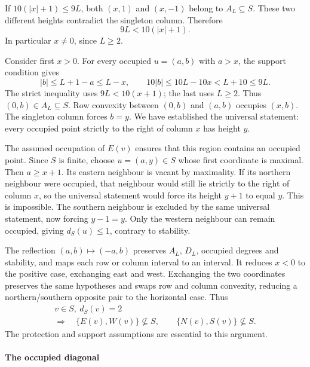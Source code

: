\documentclass[
  11pt,
  a4paper,
]{article}
\begin{document}
If \(10(|x|+1)\le9L\), both \((x,1)\) and \((x,-1)\) belong to
\(A_L\subseteq S\). These two different heights contradict the singleton
column. Therefore \[
9L<10(|x|+1).
\] In particular \(x\ne0\), since \(L\ge2\).

Consider first \(x>0\). For every occupied \(u=(a,b)\) with \(a>x\), the
support condition gives \[
|b|\le L+1-a\le L-x,\qquad
10|b|\le10L-10x<L+10\le9L.
\] The strict inequality uses \(9L<10(x+1)\); the last uses \(L\ge2\).
Thus \((0,b)\in A_L\subseteq S\). Row convexity between \((0,b)\) and
\((a,b)\) occupies \((x,b)\). The singleton column forces \(b=y\). We
have established the universal statement: every occupied point strictly
to the right of column \(x\) has height \(y\).

The assumed occupation of \(E(v)\) ensures that this region contains an
occupied point. Since \(S\) is finite, choose \(u=(a,y)\in S\) whose
first coordinate is maximal. Then \(a\ge x+1\). Its eastern neighbour is
vacant by maximality. If its northern neighbour were occupied, that
neighbour would still lie strictly to the right of column \(x\), so the
universal statement would force its height \(y+1\) to equal \(y\). This
is impossible. The southern neighbour is excluded by the same universal
statement, now forcing \(y-1=y\). Only the western neighbour can remain
occupied, giving \(d_S(u)\le1\), contrary to stability.

The reflection \((a,b)\mapsto(-a,b)\) preserves \(A_L\), \(D_L\),
occupied degrees and stability, and maps each row or column interval to
an interval. It reduces \(x<0\) to the positive case, exchanging east
and west. Exchanging the two coordinates preserves the same hypotheses
and swaps row and column convexity, reducing a northern/southern
opposite pair to the horizontal case. Thus \[
\begin{gathered}
v\in S,\ d_S(v)=2\\
\Longrightarrow\quad
\{E(v),W(v)\}\not\subseteq S,\qquad
\{N(v),S(v)\}\not\subseteq S .
\end{gathered}
\tag{G6}
\] The protection and support assumptions are essential to this
argument.

\paragraph{The occupied diagonal}\label{the-occupied-diagonal}
\end{document}
